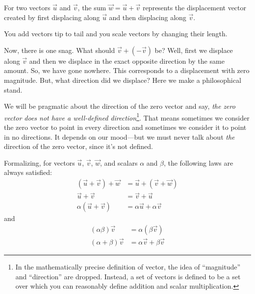 For two vectors $\vec u$ and $\vec v$, the sum $\vec w=\vec u+\vec v$ represents
the displacement vector created by first displacing along $\vec u$
and then displacing along $\vec v$.

\begin{center}
\end{center}


\begin{emphbox}[Takeaway]
	You add vectors tip to tail and you scale vectors by changing their length.
\end{emphbox}
Now, there is one snag.  What should $\vec v+(-\vec v)$ be?  Well, first we
displace along $\vec v$ and then we displace in the exact opposite direction
by the same amount.  So, we have gone nowhere.  This corresponds to a displacement
with zero magnitude.  But, what direction did we displace?  Here we make a philosophical
stand.


We will be pragmatic about the direction of the zero vector and say,
\emph{the zero vector does not have a well-defined direction}\footnote{
	In the mathematically precise definition of vector, the idea of ``magnitude''
	and ``direction'' are dropped.  Instead, a set of vectors is defined to be
	a set over which you can reasonably define addition and scalar multiplication.
}.  That means
sometimes we consider the zero vector to point in every direction and sometimes
we consider it to point in no directions.  It depends on our mood---but we must
never talk about \emph{the} direction of the zero vector, since it's not defined.

Formalizing, for vectors $\vec u$, $\vec v$, $\vec w$, and scalars $\alpha$ and $\beta$, the
following laws are always satisfied:
\begin{align*}
	(\vec u+\vec v)+\vec w&=\vec u+(\vec v+\vec w)\tag{Associativity}\\
	\vec u+\vec v&=\vec v+\vec u\tag{Commutativity}\\
	\alpha(\vec u+\vec v)&=\alpha\vec u+\alpha \vec v\tag{Distributivity}
\end{align*}
and
\begin{align*}
	(\alpha\beta)\vec v&=\alpha(\beta \vec v)\tag{Associativity II}\\
	(\alpha+\beta)\vec v&=\alpha\vec v+\beta \vec v\tag{Distributivity II}
\end{align*}

